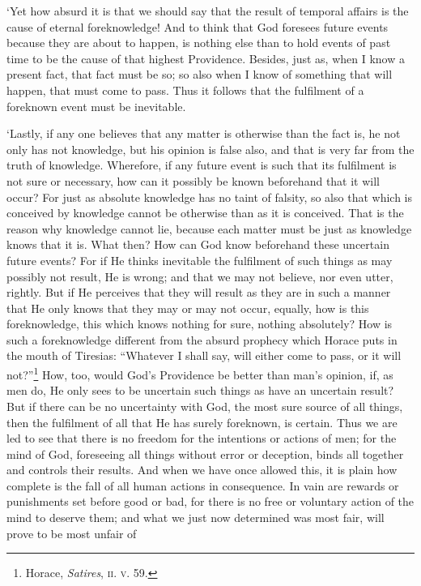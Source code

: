 `Yet how absurd it is that we should say that the result of temporal
affairs is the cause of eternal foreknowledge! And to think that God
foresees future events because they are about to happen, is nothing
else than to hold events of past time to be the cause of that highest
Providence. Besides, just as, when I know a present fact, that fact
must be so; so also when I know of something that will happen, that
must come to pass. Thus it follows that the fulfilment of a foreknown
event must be inevitable.

`Lastly, if any one believes that any matter is otherwise than the
fact is, he not only has not knowledge, but his opinion is false also,
and that is very far from the truth of knowledge. Wherefore, if any
future event is such that its fulfilment is not sure or necessary, how
can it possibly be known beforehand that it will occur? For just as
absolute knowledge has no taint of falsity, so also that which is
conceived by knowledge cannot be otherwise than as it is conceived.
That is the reason why knowledge cannot lie, because each matter must
be just as knowledge knows that it is. What then? How can God know
beforehand these uncertain future events? For if He thinks inevitable
the  fulfilment of such things as may possibly not result,
He is wrong; and that we may not believe, nor even utter, rightly. But
if He perceives that they will result as they are in such a manner
that He only knows that they may or may not occur, equally, how is
this foreknowledge, this which knows nothing for sure, nothing
absolutely? How is such a foreknowledge different from the absurd
prophecy which Horace puts in the mouth of Tiresias: ``Whatever I
shall say, will either come to pass, or it will
not?''\footnote{Horace, \textit{Satires}, \textsc{ii}. \textsc{v}.
59.} How, too, would God's Providence be better than man's opinion,
if, as men do, He only sees to be uncertain such things as have an
uncertain result? But if there can be no uncertainty with God, the
most sure source of all things, then the fulfilment of all that He has
surely foreknown, is certain. Thus we are led to see that there is no
freedom for the intentions or actions of men; for the mind of God,
foreseeing all things without error or deception, binds all together
and controls their results. And when we have once allowed this, it is
plain how complete is the fall of all human actions in consequence. In
vain are rewards or punishments set before good or bad, for there is
no free or voluntary action of the mind to deserve them; and what we
just now determined was most fair, will prove to be most unfair of
